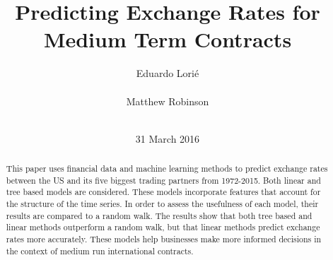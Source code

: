 \documentclass{sig-alternate-05-2015}
\begin{document}


\title{{Predicting Exchange Rates for Medium Term Contracts}
}
\author{
\alignauthor
Eduardo Lori\'{e}\\
       \\
\alignauthor 
Matthew Robinson \\
       \\
}

\date{31 March 2016}

\maketitle

\begin{abstract}
This paper uses financial data and machine learning methods to predict exchange rates between the US and its five biggest trading partners from 1972-2015. Both linear and tree based models are considered. These models incorporate features that account for the structure of the time series. In order to assess the usefulness of each model, their results are compared to a random walk. The results show that both tree based and linear methods outperform a random walk, but that linear methods predict exchange rates more accurately. These models help businesses make more informed decisions in the context of medium run international contracts.
\end{abstract}
\end{document}

